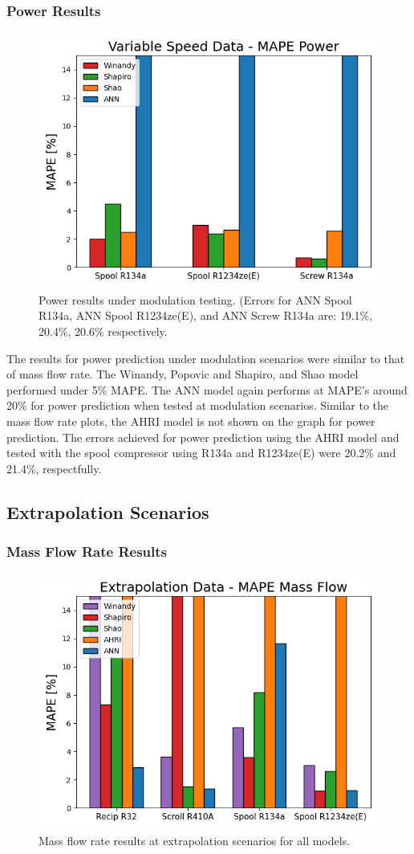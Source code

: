 \documentclass[preprint,11pt,authoryear]{elsarticle}
\begin{document}
\subsubsection{Power Results}
\begin{figure}[!h]
\centering
\includegraphics[width=0.7\linewidth]{power_vspeed.png}
\caption{Power results under modulation testing. (Errors for ANN Spool R134a, ANN Spool R1234ze(E), and ANN Screw R134a are: 19.1\%, 20.4\%, 20.6\% respectively.}
\label{fig:power_vspd}
\end{figure}
\FloatBarrier

The results for power prediction under modulation scenarios were similar to that of mass flow rate. The Winandy, Popovic and Shapiro, and Shao model performed under 5\% MAPE. The ANN model again performs at MAPE's around 20\% for power prediction when tested at modulation scenarios. Similar to the mass flow rate plots, the AHRI model is not shown on the graph for power prediction. The errors achieved for power prediction using the AHRI model and tested with the spool compressor using R134a and R1234ze(E) were  20.2\% and 21.4\%, respectfully.

\subsection{Extrapolation Scenarios}
\subsubsection{Mass Flow Rate Results}
\begin{figure}[!h]
\centering
\includegraphics[width=0.7\linewidth]{mdot_extrp.png}
\caption{Mass flow rate results at extrapolation scenarios for all models.}
\label{fig:mdot_extrp}
\end{figure}
\FloatBarrier
\end{document}
